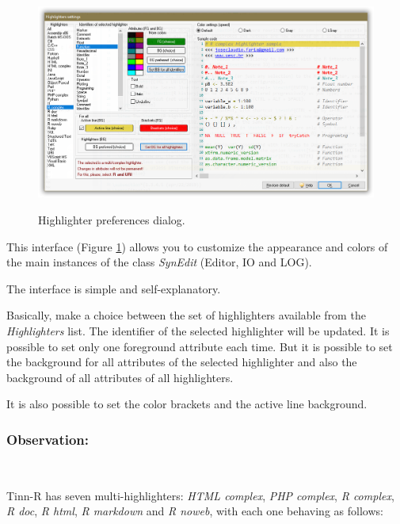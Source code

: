 \begin{figure}[H]
  \includegraphics[scale=0.50]{./res/dlg_highlighter_settings.png}\\
  \caption{Highlighter preferences dialog.}
  \label{fig:dlg_highlighter_preferences}
\end{figure}
This interface
(Figure \ref{fig:dlg_highlighter_preferences})
allows you to customize the appearance and colors of the main
instances of the class \textit{SynEdit} (Editor, IO and LOG).

The interface is simple and self-explanatory.

Basically, make a choice between the set of highlighters available
from the \textit{Highlighters} list. The identifier of the selected
highlighter will be updated. It is possible to set only one
foreground attribute each time. But it is possible to set the
background for all attributes of the selected highlighter and also
the background of all attributes of all highlighters.

It is also possible to set the color brackets and the active line
background.

\subsubsection{Observation:}\\

Tinn-R has seven multi-highlighters: \textit{HTML complex}, \textit{PHP complex},
\textit{R complex}, \textit{R doc},  \textit{R html}, \textit{R markdown} and \textit{R noweb},
with each one behaving as follows:

